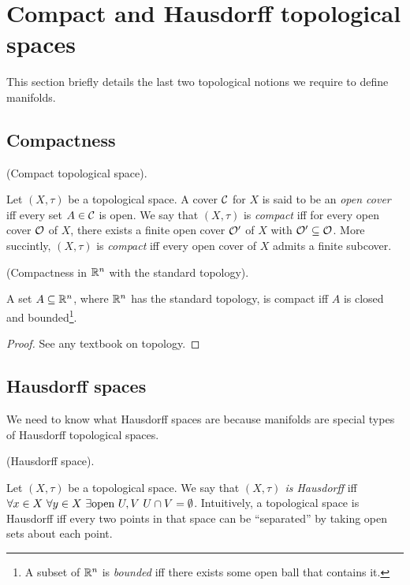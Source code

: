 \section*{Compact and Hausdorff topological spaces}

This section briefly details the last two topological notions we require to define manifolds.

\subsection*{Compactness}

\begin{defn}
    (Compact topological space).
    
    Let $(X, \tau)$ be a topological space. A cover $\mathcal{C}$ for $X$ is said to be an \textit{open cover} iff every set $A \in \mathcal{C}$ is open. We say that $(X, \tau)$ is \textit{compact} iff for every open cover $\mathcal{O}$ of $X$, there exists a finite open cover $\mathcal{O}'$ of $X$ with $\mathcal{O}' \subseteq \mathcal{O}$. More succintly, $(X, \tau)$ is \textit{compact} iff every open cover of $X$ admits a finite subcover.
\end{defn}

\begin{defn}
    (Compactness in $\mathbb{R}^n$ with the standard topology).
    
    A set $A \subseteq \mathbb{R}^n$, where $\mathbb{R}^n$ has the standard topology, is compact iff $A$ is closed and bounded\footnote{A subset of $\mathbb{R}^n$ is \textit{bounded} iff there exists some open ball that contains it.}.
\end{defn}

\begin{proof}
    See any textbook on topology.
\end{proof}

\subsection*{Hausdorff spaces}

We need to know what Hausdorff spaces are because manifolds are special types of Hausdorff topological spaces.

\begin{defn}
    (Hausdorff space).
    
    Let $(X, \tau)$ be a topological space. We say that \textit{$(X, \tau)$ is Hausdorff} iff $\forall x \in X \text{ } \forall y \in X \text{ } \exists \text{open } U, V \text{ } U \cap V = \emptyset$. Intuitively, a topological space is Hausdorff iff every two points in that space can be ``separated'' by taking open sets about each point.
\end{defn}

